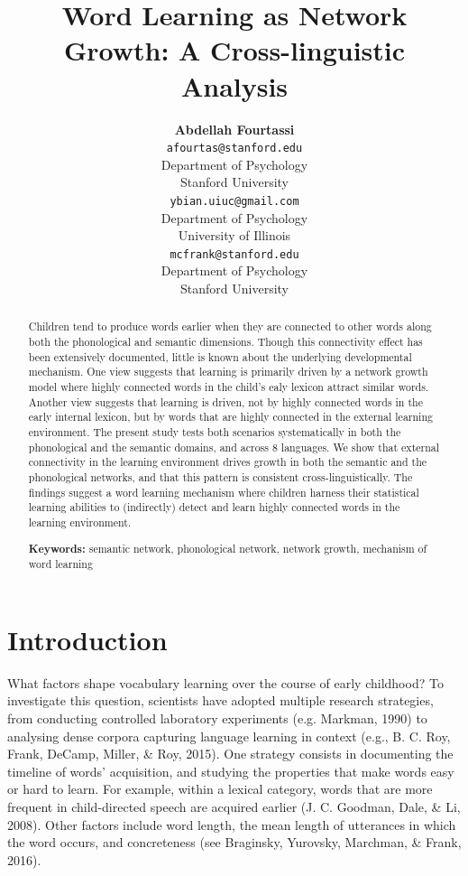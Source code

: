 \documentclass[10pt, letterpaper]{article}
\title{Word Learning as Network Growth: A Cross-linguistic Analysis}
\author{{\large \bf Abdellah Fourtassi} \\ \texttt{afourtas@stanford.edu} \\ Department of Psychology \\ Stanford University \And {\large \bf Yuan Bian} \\ \texttt{ybian.uiuc@gmail.com} \\ Department of Psychology \\ University of Illinois \And {\large \bf Michael C. Frank} \\ \texttt{mcfrank@stanford.edu} \\ Department of Psychology \\ Stanford University}
\begin{document}
\maketitle

\begin{abstract}
Children tend to produce words earlier when they are connected to other
words along both the phonological and semantic dimensions. Though this
connectivity effect has been extensively documented, little is known
about the underlying developmental mechanism. One view suggests that
learning is primarily driven by a network growth model where highly
connected words in the child's ealy lexicon attract similar words.
Another view suggests that learning is driven, not by highly connected
words in the early internal lexicon, but by words that are highly
connected in the external learning environment. The present study tests
both scenarios systematically in both the phonological and the semantic
domains, and across 8 languages. We show that external connectivity in
the learning environment drives growth in both the semantic and the
phonological networks, and that this pattern is consistent
cross-linguistically. The findings suggest a word learning mechanism
where children harness their statistical learning abilities to
(indirectly) detect and learn highly connected words in the learning
environment.

\textbf{Keywords:}
semantic network, phonological network, network growth, mechanism of
word learning
\end{abstract}

\section{Introduction}\label{introduction}

What factors shape vocabulary learning over the course of early
childhood? To investigate this question, scientists have adopted
multiple research strategies, from conducting controlled laboratory
experiments (e.g. Markman, 1990) to analysing dense corpora capturing
language learning in context (e.g., B. C. Roy, Frank, DeCamp, Miller, \&
Roy, 2015). One strategy consists in documenting the timeline of words'
acquisition, and studying the properties that make words easy or hard to
learn. For example, within a lexical category, words that are more
frequent in child-directed speech are acquired earlier (J. C. Goodman,
Dale, \& Li, 2008). Other factors include word length, the mean length
of utterances in which the word occurs, and concreteness (see Braginsky,
Yurovsky, Marchman, \& Frank, 2016).
\end{document}
